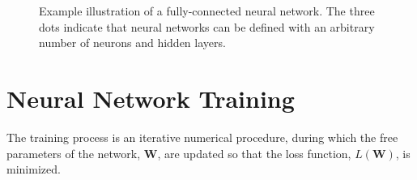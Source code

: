 


\begin{figure}[t]
    \caption{Example illustration of a fully-connected neural network. The three dots indicate that neural networks can be defined with an arbitrary number of neurons and hidden layers.}
    \label{fig:neural-net}
\end{figure}




\section{Neural Network Training}


The training process is an iterative numerical procedure, during which the free parameters of the network, $\mathbf{W}$, are updated so that the loss function, $L(\mathbf{W})$, is minimized.

